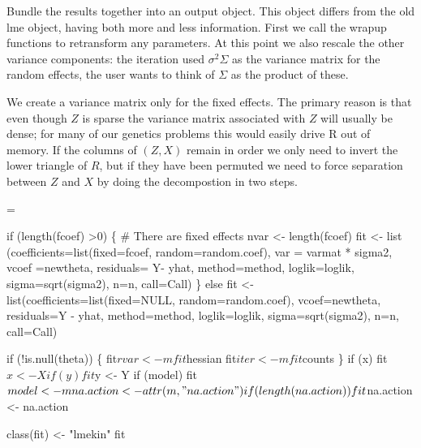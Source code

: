 \documentclass{article}
\begin{document}
Bundle the results together into an output object.
This object differs from the old lme object, having both more and less
information.  
First we call the wrapup functions to retransform any parameters.
At this point we also rescale the other variance components: the iteration
used $\sigma^2 \Sigma$ as the variance matrix for the random effects,
the user wants to think of $\Sigma$ as the product of these.

We create a variance matrix only for the fixed effects.
The primary reason is that even though $Z$ is sparse the variance
matrix associated with $Z$ will usually be dense; for many
of our genetics problems this would easily drive R out of
memory.
If the columns of $(Z,X)$ remain in order we only need to invert
the lower triangle of $R$, but if they have been permuted we
need to force separation between $Z$ and $X$ by doing the 
decompostion in two steps.
\begin{nwchunk}
=
 
 if (length(fcoef) >0) \{
     # There are fixed effects
     nvar <- length(fcoef)
     fit <- list (coefficients=list(fixed=fcoef, random=random.coef),
                  var = varmat * sigma2,
                  vcoef =newtheta,
                  residuals= Y- yhat,
                  method=method,
                  loglik=loglik,
                  sigma=sqrt(sigma2),
                  n=n,
                  call=Call)
 \}
 else fit <- list(coefficients=list(fixed=NULL, random=random.coef),
                  vcoef=newtheta,
                  residuals=Y - yhat,
                  method=method,
                  loglik=loglik,
                  sigma=sqrt(sigma2),
                  n=n,
                  call=Call)
 
 if (!is.null(theta)) \{
     fit$rvar <- mfit$hessian
     fit$iter <- mfit$counts
 \}
 if (x) fit$x <- X
 if (y) fit$y <- Y
 if (model) fit$model <- m
 
 na.action <- attr(m, "na.action")
 if (length(na.action)) fit$na.action <- na.action
                          
 class(fit) <- "lmekin"
 fit
\end{nwchunk}
\end{document}
